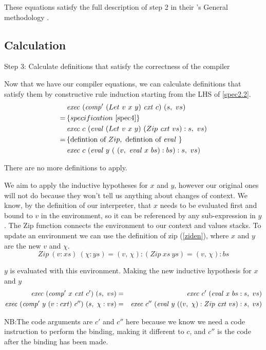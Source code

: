 \documentclass {article}
\begin{document}
These equations satisfy the full description
of step 2 in their \BH's General methodology
\cite[page 42]{bandh}.


\subsection{Calculation}\label{bindcal}

Step 3: Calculate definitions that satisfy
	the correctness of the compiler

Now that we have our compiler equations,
we can calculate definitions that satisfy
them by constructive rule induction
starting from the LHS of \ref{spec2.2}\cite[pg 42]{bandh}.
\begin{align*}
	&\mathit{exec\ } (\mathit{comp'\ }  (Let\ v\ x\ y)\ \mathit{cxt\ } c)\ (s,\ vs) \\
=\, & \{ specification\ \ref{spec4} \} \\
	&\mathit{exec\ } c\ (\mathit{eval\ }  (Let\ v\ x\ y)\ (Zip\ \mathit{cxt\ } vs):s,\ vs) \\
=\, & \{\mbox{defintion of}\ Zip,\ \mbox{defintion of}\ \mathit{eval\ } \} \\
	&\mathit{exec\ } c\ (\mathit{eval\ }  y\ (\ (v,\ \mathit{eval\ }  x\ bs) :bs) : s,\ vs)
\end{align*}

There are no more definitions to apply.

We aim to apply the inductive 
hypotheses for $x$ and $y$,
however our original ones will 
not do because they won't tell us
anything about changes of context.
We know, by the definition of our interpreter,
that $x$ needs to be evaluated first and 
bound to $v$ in the environment, so it can be 
referenced by any sub-expression
in $y$.
The Zip function connects the environment
to our context and values stacks.
To update an environment
we can use the definition of zip (\ref{ziden}),
where $x$ and $y$ are the new $v$ and $\chi$.
\[ Zip\ (v:xs)\ (\chi:ys) 
	= (v,\, \chi):(Zip\ xs\ ys) = (v,\, \chi):bs \]

$y$ is evaluated with this environment.
Making the new inductive hypothesis for $x$ and $y$
\begin{eqnarray*}
	\Exec (\Compp  x\ \cxtm c')\ (s,\ vs)
		&=& \Exec c'\ (\evalf  x\ bs : s,\ vs)\\
	\Exec (\Compp  y\ (v:cxt)\ c'')\ (s,\ \chi : vs) 
		&=& \Exec c''\ (\evalf  y\ 
					(
					(v,\ \chi) : Zip\ \cxtm vs) : s,\ vs
					)\\
\end{eqnarray*}

NB:The code arguments are $c'$ and $c''$ 
here because we know we need a code instruction
to perform the binding, making it different to $c$,
and $c''$ is the code after the binding has been made.
\end{document}

